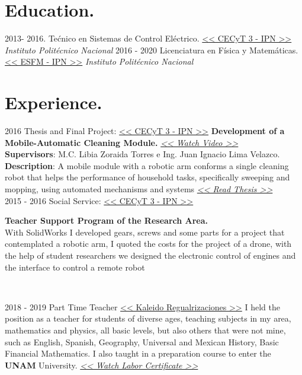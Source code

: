 \documentclass[]{friggeri-cv}
\begin{document}
\section{Education.}
\begin{entrylist}
  \entry
    {2013- 2016.}
    {Tećnico en Sistemas de Control Eléctrico.}
    {\href{https://cecyt3.ipn.mx}{<< CECyT 3 - IPN >>}}
{ \textit{Instituto Politécnico Nacional}
    }
  \entry
    {2016 - 2020}
    {Licenciatura en Física y Matemáticas.}
    {\href{https://www.esfm.ipn.mx}{<< ESFM - IPN >>}}
    {
    \textit{Instituto Politécnico Nacional}
   }
  
\end{entrylist}

\section{Experience.}
\begin{entrylist}
    
    \entry
    {2016}
    {Thesis and Final Project: }
    {\href{https://cecyt3.ipn.mx}{<< CECyT 3 - IPN >>}}
    { \textbf{Development of a Mobile-Automatic Cleaning Module.}
    \href{https://www.youtube.com/watch?v=zbDAjEfyKrY}{   \textit{<< Watch Video >>}}
    \\
    \textbf{Supervisors}: M.C. Libia Zoraida Torres e Ing. Juan Ignacio Lima Velazco.\\
    \textbf{Description}: A mobile module with a robotic arm conforms a single cleaning robot that helps the performance of household tasks, specifically sweeping and mopping, using automated mechanisms and systems \href{https://drive.google.com/file/d/12gbIxFkS-cf5gG1gvyKvA9u7UeBOZkpy/view?usp=sharing}{\textit{<< Read Thesis >>}}\\
    }
  \entry
    {2015 - 2016}
    { Social Service:}
    {\href{https://cecyt3.ipn.mx}{<< CECyT 3 - IPN >>}}
    {\textbf{Teacher Support Program of the Research Area.}
    \\
   With SolidWorks I developed gears, screws and some parts for a project that contemplated a robotic arm, I quoted the costs for the project of a drone, with the help of student researchers we designed the electronic control of engines and the interface to control a remote robot
   
   \\}
    \entry
    {2018 - 2019}
    {Part Time Teacher}
    {\href{https://www.facebook.com/Kaleido.edu/}{<< Kaleido Regualrizaciones >>}}
    {
I held the position as a teacher for students of diverse ages, teaching subjects in my area, mathematics and physics, all basic levels, but also others that were not mine, such as English, Spanish, Geography, Universal and Mexican History, Basic Financial Mathematics. I also taught in a preparation course to enter the \textbf{UNAM} University.
\href{https://drive.google.com/file/d/1w9CVCy-d3eIhm1HHeQm1GP25B_DY_1Zo/view?usp=sharing}{\textit{<< Watch Labor Certificate >>}} \\}
    \end{entrylist}
\end{document}
